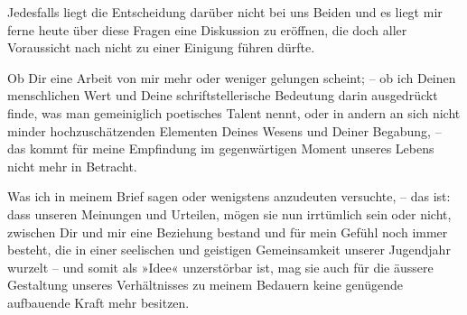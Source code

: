 \pstart
           Jedesfalls liegt die Entscheidung darüber nicht bei uns Beiden und es liegt mir ferne
                  heute über diese Fragen eine Diskussion zu
               eröffnen, die doch aller Voraussicht nach nicht zu einer Einigung führen dürfte.\pend
           
\pstart
           Ob Dir eine Arbeit von mir mehr oder weniger gelungen scheint; – ob ich Deinen
               menschlichen Wert und Deine schriftstellerische Bedeutung darin ausgedrückt finde,
               was man gemeiniglich poetisches Talent nennt, oder in andern an sich nicht minder
               hochzuschätzenden Elementen Deines Wesens und Deiner Begabung, – das kommt für meine
               Empfindung im gegenwärtigen Moment unseres Lebens nicht mehr in Betracht.\pend
           
\pstart
           Was ich in meinem Brief sagen oder wenigstens anzudeuten versuchte, – das ist: dass
                   unseren Meinungen und Urteilen, mögen sie nun
               irrtümlich sein oder nicht, zwischen Dir und mir eine Beziehung bestand und für mein
               Gefühl noch immer besteht, die in einer seelischen und geistigen Gemeinsamkeit
               unserer Jugendjahr wurzelt – und somit als »Idee« unzerstörbar ist, mag sie auch {\pb}für die äussere Gestaltung unseres Verhältnisses zu
               meinem Bedauern keine genügende aufbauende Kraft mehr besitzen.\pend
           
